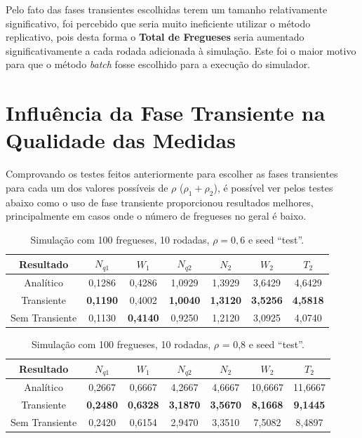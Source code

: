 \documentclass[a4paper,12pt]{report}
\begin{document}
Pelo fato das fases transientes escolhidas terem um tamanho relativamente significativo, foi percebido que seria muito ineficiente utilizar o método replicativo, pois desta forma o \textbf{Total de Fregueses} seria aumentado significativamente a cada rodada adicionada à simulação. Este foi o maior motivo para que o método \emph{batch} fosse escolhido para a execução do simulador.

\section{Influência da Fase Transiente na Qualidade das Medidas}

Comprovando os testes feitos anteriormente para escolher as fases transientes para cada um dos valores possíveis de $\rho$ ($\rho_1 + \rho_2$), é possível ver pelos testes abaixo como o uso de fase transiente proporcionou resultados melhores, principalmente em casos onde o número de fregueses no geral é baixo.

\begin{center}

\begin{table}[H]
\caption{Simulação com 100 fregueses, 10 rodadas, $\rho=0,6$ e seed ``test''.}
\bigskip
\begin{tabular}{ c c c c c c c }
  \hline
  \textbf{Resultado} & $N_{q1}$ & $W_1$ & $N_{q2}$ & $N_2$ & $W_2$ & $T_2$ \\
  \hline
  Analítico & 0,1286 & 0,4286 & 1,0929 & 1,3929 & 3,6429 & 4,6429 \\
  Transiente & \textbf{0,1190} & 0,4002 & \textbf{1,0040} & \textbf{1,3120} & \textbf{3,5256} & \textbf{4,5818}\\
  Sem Transiente & 0,1130 & \textbf{0,4140} & 0,9250 & 1,2120 & 3,0925 & 4,0740 \\
  \hline
\end{tabular}
\end{table}

\begin{table}[H]
\caption{Simulação com 100 fregueses, 10 rodadas, $\rho$ = 0,8 e seed ``test''.}
\bigskip
\begin{tabular}{ c c c c c c c }
  \hline
  \textbf{Resultado} & $N_{q1}$ & $W_1$ & $N_{q2}$ & $N_2$ & $W_2$ & $T_2$ \\
  \hline
  Analítico & 0,2667 & 0,6667 & 4,2667 & 4,6667 & 10,6667 & 11,6667 \\
  Transiente & \textbf{0,2480} & \textbf{0,6328} & \textbf{3,1870} & \textbf{3,5670} & \textbf{8,1668} & \textbf{9,1445}\\
  Sem Transiente & 0,2420 & 0,6154 & 2,9470 & 3,3510 & 7,5082 & 8,4897 \\
  \hline
\end{tabular}
\end{table}
\end{center}
\vspace{-3em}
\end{document}
